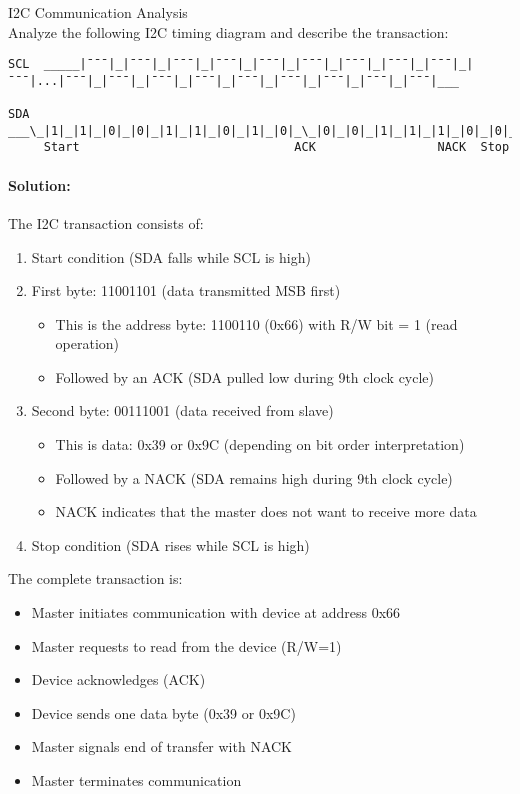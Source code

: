 \begin{example2}{I2C Communication Analysis}\\
Analyze the following I2C timing diagram and describe the transaction:

\begin{verbatim}
SCL  _____|¯¯¯|_|¯¯¯|_|¯¯¯|_|¯¯¯|_|¯¯¯|_|¯¯¯|_|¯¯¯|_|¯¯¯|_|¯¯¯|_|¯¯¯|...|¯¯¯|_|¯¯¯|_|¯¯¯|_|¯¯¯|_|¯¯¯|_|¯¯¯|_|¯¯¯|_|¯¯¯|_|¯¯¯|___
                     
SDA  ___\_|1|_|1|_|0|_|0|_|1|_|1|_|0|_|1|_|0|_\_|0|_|0|_|1|_|1|_|1|_|0|_|0|_|1|_/___
     Start                              ACK                 NACK  Stop
\end{verbatim}

\tcblower
\paragraph{Solution:}
The I2C transaction consists of:
\begin{enumerate}
    \item Start condition (SDA falls while SCL is high)
    \item First byte: 11001101 (data transmitted MSB first)
    \begin{itemize}
        \item This is the address byte: 1100110 (0x66) with R/W bit = 1 (read operation)
        \item Followed by an ACK (SDA pulled low during 9th clock cycle)
    \end{itemize}
    \item Second byte: 00111001 (data received from slave)
    \begin{itemize}
        \item This is data: 0x39 or 0x9C (depending on bit order interpretation)
        \item Followed by a NACK (SDA remains high during 9th clock cycle)
        \item NACK indicates that the master does not want to receive more data
    \end{itemize}
    \item Stop condition (SDA rises while SCL is high)
\end{enumerate}

The complete transaction is:
\begin{itemize}
    \item Master initiates communication with device at address 0x66
    \item Master requests to read from the device (R/W=1)
    \item Device acknowledges (ACK)
    \item Device sends one data byte (0x39 or 0x9C)
    \item Master signals end of transfer with NACK
    \item Master terminates communication
\end{itemize}
\end{example2}

